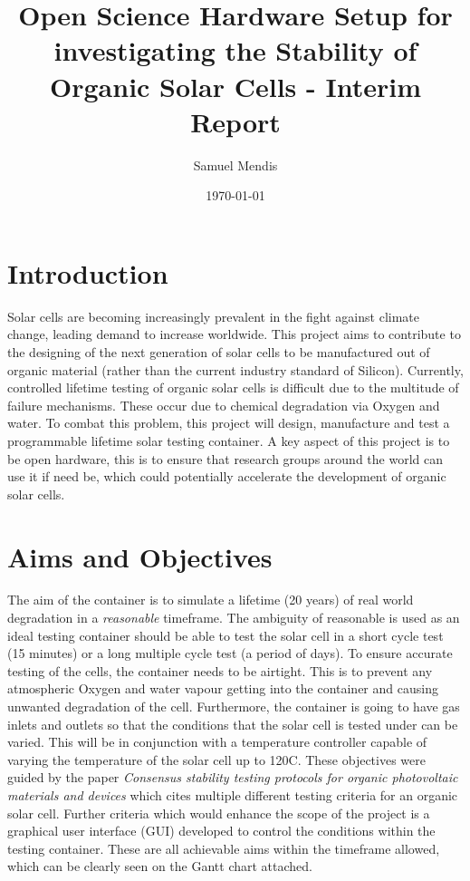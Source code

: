 \documentclass[a4paper,11pt]{article}
\begin{document}
\title{Open Science Hardware Setup for investigating the Stability of Organic Solar Cells - Interim Report}
\author{Samuel Mendis}
\date{\today}
\maketitle
\pagebreak
\section{Introduction}
Solar cells are becoming increasingly prevalent in the fight against climate change\cite[p.~XV]{RN45}, leading demand to increase worldwide. This project aims to contribute to the designing of the next generation of solar cells to be manufactured out of organic material (rather than the current industry standard of Silicon). Currently, controlled lifetime testing of organic solar cells is difficult due to the multitude of failure mechanisms. These occur due to chemical degradation via Oxygen and water\cite[p.~689]{RN38}. To combat this problem, this project will design, manufacture and test a programmable lifetime solar testing container. A key aspect of this project is to be open hardware, this is to ensure that research groups around the world can use it if need be, which could potentially accelerate the development of organic solar cells. 

\section{Aims and Objectives}
The aim of the container is to simulate a lifetime (20 years) of real world degradation in a \emph{reasonable} timeframe. The ambiguity of reasonable is used as an ideal testing container should be able to test the solar cell in a short cycle test (15 minutes) or a long multiple cycle test (a period of days). To ensure accurate testing of the cells, the container needs to be airtight. This is to prevent any atmospheric Oxygen and water vapour getting into the container and causing unwanted degradation of the cell. Furthermore, the container is going to have gas inlets and outlets so that the conditions that the solar cell is tested under can be varied. This will be in conjunction with a temperature controller capable of varying the temperature of the solar cell up to 120\textdegree C. These objectives were guided by the paper \emph{Consensus stability testing protocols for organic photovoltaic materials and devices} \cite[p.~1255-1261]{RN47} which cites multiple different testing criteria for an organic solar cell. Further criteria which would enhance the scope of the project is a graphical user interface (GUI) developed to control the conditions within the testing container. These are all achievable aims within the timeframe allowed, which can be clearly seen on the Gantt chart attached. 
\end{document}
